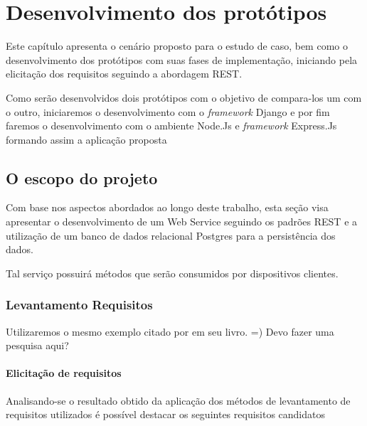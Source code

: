
\chapter{Desenvolvimento dos protótipos}
\label{desenvolvimento-prototipos}

\vspace{-1.9cm}


  Este capítulo apresenta o cenário proposto para o estudo de caso, bem
  como o desenvolvimento dos protótipos com suas fases de implementação, iniciando
  pela elicitação dos requisitos seguindo a abordagem \ac{REST}.
  
  Como serão desenvolvidos dois protótipos com o objetivo de compara-los um com o outro,
  iniciaremos o desenvolvimento com o \textit{framework} Django e por fim faremos o desenvolvimento
  com o ambiente Node.Js e \textit{framework} Express.Js formando assim a aplicação proposta
  
\section{O escopo do projeto}
\label{escopo-projeto}

  Com base nos aspectos abordados ao longo deste trabalho, 
  esta seção visa apresentar o desenvolvimento de um Web Service seguindo os padrões \ac{REST} e a utilização 
  de um banco de dados relacional Postgres para a persistência dos dados.
  
  Tal serviço possuirá métodos que serão consumidos por dispositivos clientes.

\subsection{Levantamento Requisitos}
\label{levantamento-requisitos}

  Utilizaremos o mesmo exemplo citado por \cite{Pereira:2013} em seu livro. =)
  Devo fazer uma pesquisa aqui?

\subsubsection{Elicitação de requisitos}

  Analisando-se o resultado obtido da aplicação dos métodos de levantamento
  de requisitos utilizados é possível destacar os seguintes requisitos candidatos

